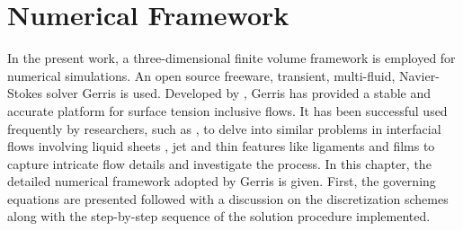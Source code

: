 \chapter{Numerical Framework}
In the present work, a three-dimensional finite volume framework is employed for numerical simulations. An open source freeware, transient, multi-fluid, Navier-Stokes solver Gerris is used. Developed by \citet{Popinet2003,popinet2009}, Gerris has provided a stable and accurate platform for surface tension inclusive flows. It has been successful used frequently by researchers, such as \citet{chen2013high,kumar2016physical,kumar2017bending,kumar2017air}, to delve into similar problems in interfacial flows involving liquid sheets \citep{fuster2013instability,zhang2017effects}, jet \citep{yang2017simulation,xie2017instability} and thin features like ligaments and films \citep{agbaglah2015drop,walls2015jet} to capture intricate flow details and investigate the process. In this chapter, the detailed numerical framework adopted by Gerris is given. First, the governing equations are presented followed with a discussion on the discretization schemes along with the step-by-step sequence of the solution procedure implemented.
